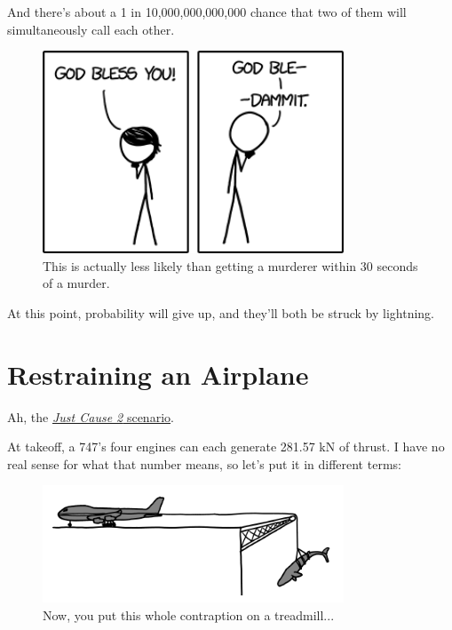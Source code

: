 {{And there's about a 1 in 10,000,000,000,000 chance that two of them will simultaneously call each other.}

\begin{figure}[!htbp]
\centering
\includegraphics[scale=0.5, max width=0.8\textwidth]{imgs/a/55/sneeze_double.png}
\caption{This is actually less likely than getting a murderer within 30 seconds of a murder.}
\end{figure}

{At this point, probability will give up, and they'll both be struck by lightning.}

{
\chapter{Restraining an Airplane}
}

\hfill{}

{Ah, the \href{http://www.youtube.com/results?search\_query=just+cause+2+plane+grapple}{ \emph{Just Cause 2} scenario}.}

{At takeoff, a 747's four engines can each generate 281.57 kN of thrust. I have no real sense for what that number means, so let's put it in different terms:}

\begin{figure}[!htbp]
\centering
\includegraphics[scale=0.5, max width=0.8\textwidth]{imgs/a/56/747_whale.png}
\caption{Now, you put this whole contraption on a treadmill...}
\end{figure}

}
